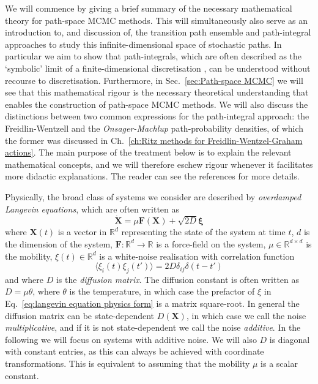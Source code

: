 We will commence by giving a brief summary of the necessary mathematical theory for path-space MCMC methods. This will simultaneously also serve as an introduction to, and discussion of, the transition path ensemble and path-integral approaches to study this infinite-dimensional space of stochastic paths. In particular we aim to show that path-integrals, which are often described as the `symbolic' limit of a finite-dimensional discretisation \citep{mossNoiseNonlinearDynamical1989, stratonovichMarkovMethodsTheory1989}, can be understood without recourse to discretisation. Furthermore, in Sec.~\ref{sec:Path-space MCMC} we will see that this mathematical rigour is the necessary theoretical understanding that enables the construction of path-space MCMC methods. We will also discuss the distinctions between two common expressions for the path-integral approach: the Freidlin-Wentzell and the \textit{Onsager-Machlup} path-probability densities, of which the former was discussed in Ch.~\ref{ch:Ritz methods for Freidlin-Wentzel-Graham actions}. The main purpose of the treatment below is to explain the relevant mathematical concepts, and we will therefore eschew rigour whenever it facilitates more didactic explanations. The reader can see the references for more details.

Physically, the broad class of systems we consider are described by \textit{overdamped Langevin equations}, which are often written as \citep{kampenStochasticProcessesPhysics1992, riskenFokkerPlanckEquationMethods2012a}
\begin{equation} \label{eq:langevin equation physics form}
\dot{\mathbf{X}} = \mu \mathbf{F}(\mathbf{X}) + \sqrt{2D} \boldsymbol{\xi}
\end{equation}
where $\mathbf{X}(t)$ is a vector in $\mathbb{R}^d$ representing the state of the system at time $t$, $d$ is the dimension of the system, $\mathbf{F} : \mathbb{R}^d \to \mathbb{R}$ is a force-field on the system, $\mu \in \mathbb{R}^{d \times d}$ is the mobility, $\xi(t) \in \mathbb{R}^d$  is a white-noise realisation with correlation function
\begin{equation}
\langle \xi_i(t) \xi_j(t') \rangle = 2 D \delta_{ij} \delta(t - t')
\end{equation}
and where $D$ is the \textit{diffusion matrix}. The diffusion constant is often written as $D = \mu \theta$, where $\theta$ is the temperature, in which case the prefactor of $\xi$ in Eq.~\ref{eq:langevin equation physics form} is a matrix square-root. In general the diffusion matrix can be state-dependent $D(\mathbf{X})$, in which case we call the noise \textit{multiplicative}, and if it is not state-dependent we call the noise \textit{additive}. In the following we will focus on systems with additive noise. We will also $D$ is diagonal with constant entries, as this can always be achieved with coordinate transformations. This is equivalent to assuming that the mobility $\mu$ is a scalar constant.

